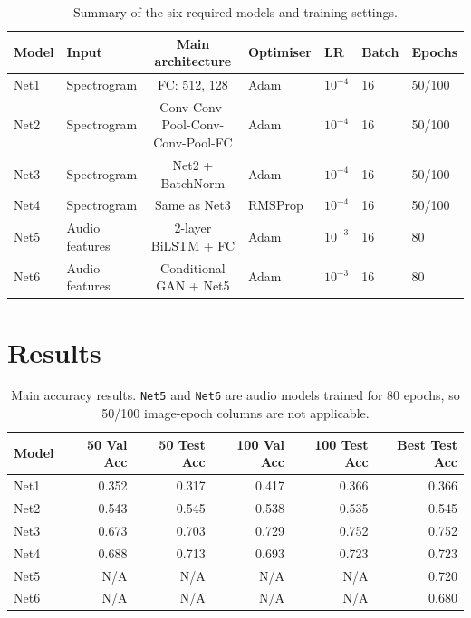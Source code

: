 \documentclass[10pt,twocolumn,letterpaper]{article}
\begin{document}
\begin{table}[t]
\centering
\small
\setlength{\tabcolsep}{3pt}
\begin{tabular}{llcllll}
\toprule
Model & Input & Main architecture & Optimiser & LR & Batch & Epochs \\
\midrule
Net1 & Spectrogram & FC: 512, 128 & Adam & $10^{-4}$ & 16 & 50/100 \\
Net2 & Spectrogram & Conv-Conv-Pool-Conv-Conv-Pool-FC & Adam & $10^{-4}$ & 16 & 50/100 \\
Net3 & Spectrogram & Net2 + BatchNorm & Adam & $10^{-4}$ & 16 & 50/100 \\
Net4 & Spectrogram & Same as Net3 & RMSProp & $10^{-4}$ & 16 & 50/100 \\
Net5 & Audio features & 2-layer BiLSTM + FC & Adam & $10^{-3}$ & 16 & 80 \\
Net6 & Audio features & Conditional GAN + Net5 & Adam & $10^{-3}$ & 16 & 80 \\
\bottomrule
\end{tabular}
\caption{Summary of the six required models and training settings.}
\label{tab:models}
\end{table}

\section{Results}

\begin{table}[t]
\centering
\small
\setlength{\tabcolsep}{4pt}
\begin{tabular}{lrrrrr}
\toprule
Model & 50 Val Acc & 50 Test Acc & 100 Val Acc & 100 Test Acc & Best Test Acc \\
\midrule
Net1 & 0.352 & 0.317 & 0.417 & 0.366 & 0.366 \\
Net2 & 0.543 & 0.545 & 0.538 & 0.535 & 0.545 \\
Net3 & 0.673 & 0.703 & 0.729 & 0.752 & 0.752 \\
Net4 & 0.688 & 0.713 & 0.693 & 0.723 & 0.723 \\
Net5 & N/A & N/A & N/A & N/A & 0.720 \\
Net6 & N/A & N/A & N/A & N/A & 0.680 \\
\bottomrule
\end{tabular}
\caption{Main accuracy results. \texttt{Net5} and \texttt{Net6} are audio models trained for 80 epochs, so 50/100 image-epoch columns are not applicable.}
\label{tab:results}
\end{table}
\end{document}
